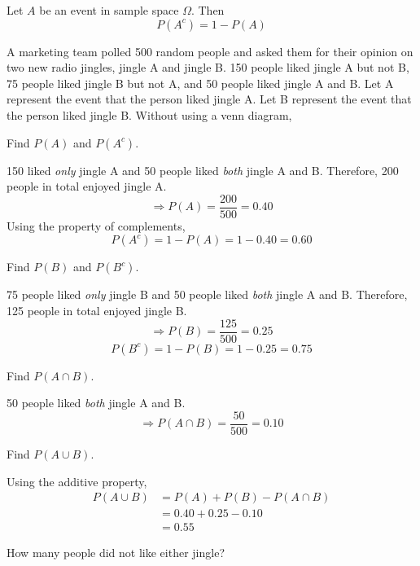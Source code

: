 \hfill
\begin{property}
Let $A$ be an event in sample space $\Omega$. 
Then
	\begin{equation}
	P(A^{c}) = 1 - P(A)
	\end{equation}
\end{property}




\begin{example}
A marketing team polled 500 random people and asked them for their opinion on two new radio jingles, jingle A and jingle B. 150 people liked jingle A but not B, 75 people liked jingle B but not A, and 50 people liked jingle A and B. Let A represent the event that the person liked jingle A. Let B represent the event that the person liked jingle B. Without using a venn diagram,

\begin{benumerate}
\item Find $P(A)$ and $P(A^{c})$.

150 liked \textit{only} jingle A and 50 people liked \textit{both} jingle A and B. Therefore, 200 people in total enjoyed jingle A. 
\[ \Rightarrow P(A) = \frac{200}{500} = 0.40 \] 
Using the property of complements,
\[ P(A^{c}) = 1 - P(A) = 1 - 0.40 = 0.60 \]

\item Find $P(B)$ and $P(B^{c})$.

75 people liked \textit{only} jingle B and 50 people liked \textit{both} jingle A and B. Therefore, 125 people in total enjoyed jingle B.
\[ \Rightarrow P(B) = \frac{125}{500} = 0.25\]
\[ P(B^{c}) = 1 - P(B) = 1 - 0.25 = 0.75 \]

\item Find $P (A \cap B)$.

50 people liked \textit{both} jingle A and B.
\[ \Rightarrow P(A \cap B) = \frac{50}{500} = 0.10 \]

\item Find $P (A \cup B)$.

Using the additive property,
\begin{align*}
 P(A \cup B) 	&= P(A) + P(B) - P(A \cap B) \\
 				&= 0.40 + 0.25 - 0.10 \\
 				&= 0.55
\end{align*}

\item How many people did not like either jingle?


\end{benumerate}
\end{example}
